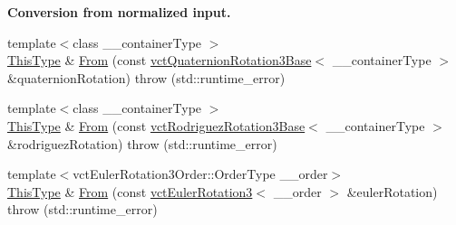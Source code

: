 \begin{Indent}{\bf Conversion from normalized input.}
\begin{DoxyCompactItemize}
\item 
{\footnotesize template$<$class \+\_\+\+\_\+container\+Type $>$ }\\\hyperlink{classvct_matrix_rotation3_base_a027be766cb10ca3c2ad8e85c28ed0af9}{This\+Type} \& \hyperlink{classvct_matrix_rotation3_base_ab20e8228478b7e9e06ba3f84da04697c}{From} (const \hyperlink{classvct_quaternion_rotation3_base}{vct\+Quaternion\+Rotation3\+Base}$<$ \+\_\+\+\_\+container\+Type $>$ \&quaternion\+Rotation)  throw (std\+::runtime\+\_\+error)
\item 
{\footnotesize template$<$class \+\_\+\+\_\+container\+Type $>$ }\\\hyperlink{classvct_matrix_rotation3_base_a027be766cb10ca3c2ad8e85c28ed0af9}{This\+Type} \& \hyperlink{classvct_matrix_rotation3_base_a2a38e298103d26375699b63a54762e9a}{From} (const \hyperlink{classvct_rodriguez_rotation3_base}{vct\+Rodriguez\+Rotation3\+Base}$<$ \+\_\+\+\_\+container\+Type $>$ \&rodriguez\+Rotation)  throw (std\+::runtime\+\_\+error)
\item 
{\footnotesize template$<$vct\+Euler\+Rotation3\+Order\+::\+Order\+Type \+\_\+\+\_\+order$>$ }\\\hyperlink{classvct_matrix_rotation3_base_a027be766cb10ca3c2ad8e85c28ed0af9}{This\+Type} \& \hyperlink{classvct_matrix_rotation3_base_a50d343bc1b91fcf9c736d3b652a9f39a}{From} (const \hyperlink{classvct_euler_rotation3}{vct\+Euler\+Rotation3}$<$ \+\_\+\+\_\+order $>$ \&euler\+Rotation)  throw (std\+::runtime\+\_\+error)
\end{DoxyCompactItemize}
\end{Indent}

